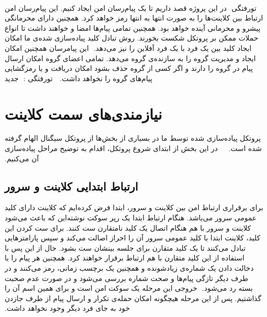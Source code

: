 ‫
‫%
‫%
‫%
\newif\iffigure
\figuretrue

‫
‫
‫
‫‌تورفتگی
‫
‫در این پروژه قصد داریم تا یک پیام‌رسان امن ایجاد کنیم. این پیام‌رسان امن ارتباط بین کلاینت‌ها را به صورت انتها به انتها رمز خواهد کرد. همچنین دارای محرمانگی پیشرو و محرمانی آینده خواهد بود. همچنین تمامی پیام‌ها امضا و  خواهند داشت تا انواع حملات ممکن بر پروتکل شکست بخورند. روش تبادل کلید پیاده‌سازی شده‌ی ما امکان ایجاد کلید بین یک فرد با یک فرد آفلاین را نیز می‌دهد.
‫
‫این پیامرسان همچنین امکان ایجاد و مدیریت گروه را به سازنده‌ی گروه می‌دهد. تمامی اعضای گروه امکان ارسال پیام در گروه را دارند و اگر کسی از گروه حذف بشود امکان دریافت و یا رمزگشایی پیام‌های گروه را نخواهد داشت.
‫
‫
‫‌تورفتگی : 
‫
‫‌جدید
‫ 
‫\section{نیازمندی‌های سمت کلاینت}
‫پروتکل پیاده‌سازی شده توسط ما در بسیاری از بخش‌ها از پروتکل سیگنال الهام گرفته شده است. ~
‫
‫در این بخش از ابتدای شروع پروتکل، اقدام به توضیح مراحل پیاده‌سازی آن می‌کنیم.
‫\subsection{ارتباط ابتدایی کلاینت و سرور}
‫برای برقراری ارتباط امن بین کلاینت و سرور، ابتدا فرض کرده‌ایم که کلاینت دارای کلید عمومی سرور می‌باشد. هنگام ارتباط ابتدا یک رپر سوکت نوشته‌این که باعث می‌شود کلاینت و سرور با هم هنگام اتصال یک کلید نامتقارن ست کنند. برای ست کردن این کلید، کلاینت ابتدا با کلید عمومی سرور آن را احراز اصالت می‌کند و سپس پارامتر‌هایی تبادل می‌کنند تا یک کلید متقارن برای جلسه بینشان ست بشود. حال از این پس با استفاده از این کلید متقارن با هم ارتباط برقرار خواهند کرد. همچنین هر پیام را با دخالت دادن یک شماره‌ی زیادشونده و همچنین یک برچسب زمانی، رمز می‌کنند و در طرف دیگر تازگی پیام‌ها و صحت شماره بررسی می‌شود و در صورت عدم صحبت بسته رد می‌شود.
‫
‫خروجی این مرحله یک سوکت امن است و برای همین اسم آن را  گذاشتیم. پس از این مرحله هیچگونه امکان حمله‌ی تکرار و ارسال پیام از طرف جازدن خود به جای فرد دیگر وجود نخواهد داشت.
‫
